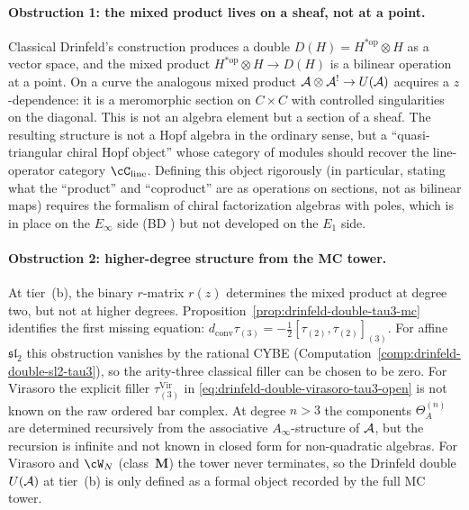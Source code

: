\paragraph{Obstruction 1: the mixed product lives on a sheaf,
not at a point.} Classical Drinfeld's construction
\cite{Drinfeld85,Drinfeld90} produces a double
$D(H) = H^{*\mathrm{op}}\otimes H$ as a vector space, and
the mixed product $H^{*\mathrm{op}}\otimes H\to D(H)$ is
a bilinear operation at a point. On a curve the
analogous mixed product $\mathcal{A}\otimes\mathcal{A}^!\to U(\mathcal{A})$
acquires a $z$-dependence: it is a meromorphic section
on $C\times C$ with controlled singularities on the
diagonal. This is not an algebra element but a section
of a sheaf. The resulting structure is not a Hopf
algebra in the ordinary sense, but a
``quasi-triangular chiral Hopf object'' whose category of
modules should recover the line-operator category
$\cC_{\mathrm{line}}$. Defining this object rigorously
(in particular, stating what the ``product'' and
``coproduct'' are as operations on sections, not as
bilinear maps) requires the formalism of chiral
factorization algebras with poles, which is in place on
the $E_\infty$ side (BD \cite{BD04}) but not developed
on the $E_1$ side.

\paragraph{Obstruction 2: higher-degree structure from the
MC tower.} At tier~(b), the binary $r$-matrix $r(z)$
determines the mixed product at degree two, but not at
higher degrees. Proposition~\ref{prop:drinfeld-double-tau3-mc}
identifies the first missing equation:
$d_{\mathrm{conv}}\tau_{(3)}
=-\frac12[\tau_{(2)},\tau_{(2)}]_{(3)}$. For affine
$\mathfrak{sl}_2$ this obstruction vanishes by the rational CYBE
(Computation~\ref{comp:drinfeld-double-sl2-tau3}), so the
arity-three classical filler can be chosen to be zero. For Virasoro
the explicit filler
$\tau_{(3)}^{\mathrm{Vir}}$ in
\eqref{eq:drinfeld-double-virasoro-tau3-open} is not known on the raw
ordered bar complex. At degree $n>3$ the components
$\Theta_A^{(n)}$ are determined recursively from the associative
$A_\infty$-structure of $\mathcal{A}$, but the recursion is infinite and not
known in closed form for non-quadratic algebras. For Virasoro and
$\cW_N$ (class~$\mathbf{M}$) the tower never terminates, so the
Drinfeld double $U(\mathcal{A})$ at tier~(b) is only defined as a formal object
recorded by the full MC tower.

